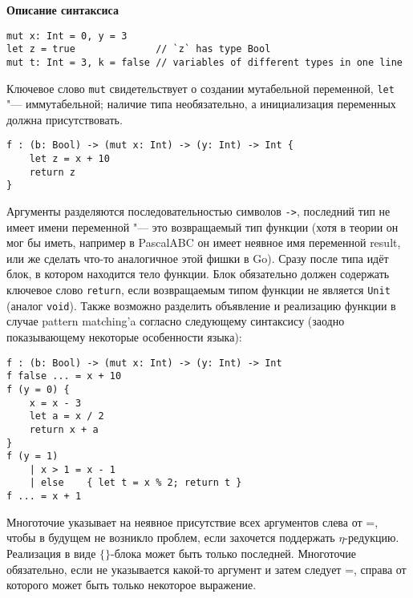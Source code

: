 \documentclass[11pt,a4paper]{article}
\begin{document}
\textbf{\large{Описание синтаксиса\\}}


\begin{lstlisting}[caption=Объявление переменных]
mut x: Int = 0, y = 3
let z = true              // `z` has type Bool
mut t: Int = 3, k = false // variables of different types in one line
\end{lstlisting}

Ключевое слово \texttt{mut} свидетельствует о создании мутабельной переменной, \texttt{let} "--- иммутабельной; наличие типа необязательно, а инициализация переменных должна присутствовать.\\ 


\begin{lstlisting}[caption=Объявление функции]
f : (b: Bool) -> (mut x: Int) -> (y: Int) -> Int {
    let z = x + 10
    return z
}
\end{lstlisting}

Аргументы разделяются последовательностью символов \texttt{->}, последний тип не имеет имени переменной "--- это возвращаемый тип функции (хотя в теории он мог бы иметь, например в PascalABC он имеет неявное имя переменной result, или же сделать что-то аналогичное этой фишки в Go). Сразу после типа идёт блок, в котором находится тело функции. Блок обязательно должен содержать ключевое слово \texttt{return}, если возвращаемым типом функции не является \texttt{Unit} (аналог \texttt{void}).
Также возможно разделить объявление и реализацию функции в случае pattern matching'a согласно следующему синтаксису (заодно показывающему некоторые особенности языка):

\begin{lstlisting}[caption=Pattern matching]
f : (b: Bool) -> (mut x: Int) -> (y: Int) -> Int
f false ... = x + 10
f (y = 0) {
    x = x - 3
    let a = x / 2
    return x + a
}
f (y = 1) 
    | x > 1 = x - 1
    | else    { let t = x % 2; return t }
f ... = x + 1
\end{lstlisting}

Многоточие указывает на неявное присутствие всех аргументов слева от =, чтобы в будущем не возникло проблем, если захочется поддержать $\eta$-редукцию.
Реализация в виде $\{\}$-блока может быть только последней. Многоточие обязательно, если не указывается какой-то аргумент и затем следует =, справа от которого может быть только некоторое выражение.\\
\end{document}
